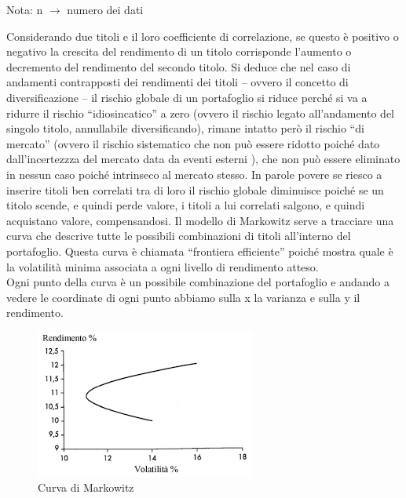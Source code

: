 \begin{Nota}
 Nota: n $\rightarrow$ numero dei dati\\
\end{Nota}

\noindent
Considerando due titoli e il loro coefficiente di correlazione, se questo è positivo o negativo la crescita del rendimento di un titolo corrisponde l’aumento o decremento del rendimento del secondo titolo. Si deduce che nel caso di andamenti contrapposti dei rendimenti dei titoli – ovvero il concetto di diversificazione – il rischio globale di un portafoglio si riduce perché si va a ridurre il rischio “idiosincatico” a zero (ovvero il rischio legato all’andamento del singolo titolo, annullabile diversificando), rimane intatto però il rischio “di mercato” (ovvero il rischio sistematico che non può essere ridotto poiché dato dall’incertezzza del mercato data da eventi esterni ), che non può essere eliminato in nessun caso poiché intrinseco al mercato stesso. In parole povere se riesco a inserire titoli ben correlati tra di loro il rischio globale diminuisce poiché se un titolo scende, e quindi perde valore, i titoli a lui correlati salgono, e quindi acquistano valore, compensandosi.
Il modello di Markowitz serve a tracciare una curva che descrive tutte le possibili combinazioni di titoli all’interno del portafoglio. Questa curva è chiamata “frontiera efficiente”  poiché mostra quale è la volatilità minima associata a ogni livello di  rendimento atteso.\\
Ogni punto della curva è un possibile combinazione del portafoglio e andando a vedere le coordinate di ogni punto abbiamo sulla x la varianza e sulla y il rendimento.

\begin{figure}[!ht]
    \centering
    \includegraphics[scale=1.2]{pictures/grafico_markowitz.png}
    \caption{Curva di Markowitz}
    \label{Curva di Markowitz}
\end{figure}

